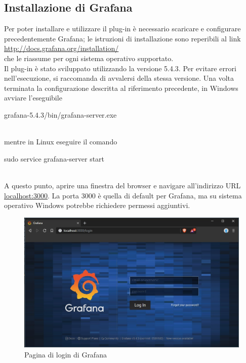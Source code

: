 \subsection{Installazione di Grafana}
Per poter installare e utilizzare il plug-in è necessario scaricare e configurare precedentemente Grafana; le istruzioni di installazione sono reperibili al link\\[0.2cm]
\hspace*{10mm}\url{http://docs.grafana.org/installation/} \\[0.2cm]
che le riassume per ogni sistema operativo supportato.\\
Il plug-in è stato sviluppato utilizzando la versione 5.4.3. Per evitare errori nell'esecuzione, si raccomanda di avvalersi della stessa versione.
Una volta terminata la configurazione descritta al riferimento precedente, in Windows avviare l'eseguibile\\[0.2cm]
\hspace*{10mm}\begin{ttfamily}grafana-5.4.3/bin/grafana-server.exe\end{ttfamily}\\[0.2cm] mentre in Linux eseguire il comando\\[0.2cm]
\hspace*{10mm}\begin{ttfamily}sudo service grafana-server start\end{ttfamily}\\[0.2cm]
A questo punto, aprire una finestra del browser e navigare all'indirizzo URL \url{localhost:3000}. La porta 3000 è quella di default per Grafana, ma su sistema operativo Windows potrebbe richiedere permessi aggiuntivi.
\begin{figure} [H]
	\centerline{
		\includegraphics[scale=0.5]{Img/grafana_login}}
	\caption{Pagina di login di Grafana}\label{}
\end{figure}
